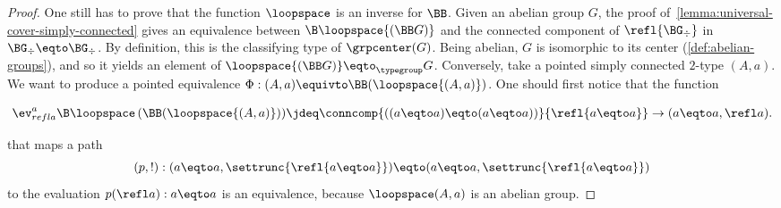 \begin{proof}
  One still has to prove that the function $\loopspace$ is an inverse
  for $\BB$. Given an abelian group $G$, the proof
  of~\cref{lemma:universal-cover-simply-connected} gives an
  equivalence between $\B\loopspace {(\BB G)}$ and the connected
  component of $\refl {\BG_\div}$ in $\BG_\div\eqto \BG_\div$. By
  definition, this is the classifying type of $\grpcenter(G)$. Being
  abelian, $G$ is isomorphic to its center
  (\cref{def:abelian-groups}), and so it yields an element of
  $\loopspace {(\BB G)} \eqto_{\typegroup} G$. %
  Conversely, take a pointed simply connected $2$-type $(A,a)$. We
  want to produce a pointed equivalence
  $\Phi : (A,a) \equivto \BB (\loopspace {(A,a)}) $. One should first
  notice that the function
  \begin{fullwidth}
    \begin{equation}
      \label{eq:loopspace-A-abelian}%
      \ev^a_{refl a}{\B\loopspace \left( \BB (\loopspace {(A,a)}) \right)}
      \jdeq \conncomp{((a\eqto a)\eqto (a\eqto a))}{\refl{a\eqto a}} \to (a\eqto a,\refl a).
    \end{equation}
  \end{fullwidth}
  that maps a path
  \begin{displaymath}
    (p,!):(a\eqto a,\settrunc{\refl{a\eqto a}})\eqto (a\eqto a,\settrunc{\refl{a\eqto a}})
  \end{displaymath}
  to the evaluation $p(\refl a): a\eqto a$ is an equivalence, because
  $\loopspace (A,a)$ is an abelian group.


\end{proof}
